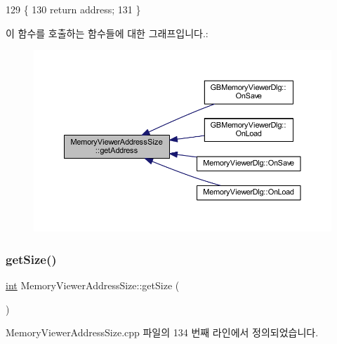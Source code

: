 \begin{DoxyCode}
129 \{
130   \textcolor{keywordflow}{return} address;
131 \}
\end{DoxyCode}
이 함수를 호출하는 함수들에 대한 그래프입니다.\+:
\nopagebreak
\begin{figure}[H]
\begin{center}
\leavevmode
\includegraphics[width=350pt]{class_memory_viewer_address_size_a3d31492056e5b255aa882f7732671c4c_icgraph}
\end{center}
\end{figure}
\mbox{\label{class_memory_viewer_address_size_ade3cfceb89cd35954e57d10dba882eb1}} 
\subsubsection{\texorpdfstring{get\+Size()}{getSize()}}
{\footnotesize\ttfamily \mbox{\hyperlink{_util_8cpp_a0ef32aa8672df19503a49fab2d0c8071}{int}} Memory\+Viewer\+Address\+Size\+::get\+Size (\begin{DoxyParamCaption}{ }\end{DoxyParamCaption})}



Memory\+Viewer\+Address\+Size.\+cpp 파일의 134 번째 라인에서 정의되었습니다.


